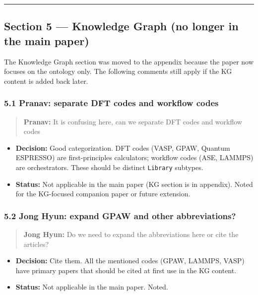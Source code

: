 \begin{center}\rule{0.5\linewidth}{0.5pt}\end{center}

\subsection{Section 5 --- Knowledge Graph (no longer in the main paper)}\label{section-5-knowledge-graph-no-longer-in-the-main-paper}

The Knowledge Graph section was moved to the appendix because the paper now focuses on the ontology only. The following comments still apply if the KG content is added back later.

\subsubsection{5.1 Pranav: separate DFT codes and workflow codes}\label{pranav-separate-dft-codes-and-workflow-codes}

\begin{quote}
\textbf{Pranav:} It is confusing here, can we separate DFT codes and workflow codes
\end{quote}

\begin{itemize}
\tightlist
\item
  \textbf{Decision:} Good categorization. DFT codes (VASP, GPAW, Quantum ESPRESSO) are first-principles calculators; workflow codes (ASE, LAMMPS) are orchestrators. These should be distinct \texttt{Library} subtypes.
\item
  \textbf{Status:} {\color{orange!80!black}\faPauseCircle} Not applicable in the main paper (KG section is in appendix). Noted for the KG-focused companion paper or future extension.
\end{itemize}

\subsubsection{5.2 Jong Hyun: expand GPAW and other abbreviations?}\label{jong-hyun-expand-gpaw-and-other-abbreviations}

\begin{quote}
\textbf{Jong Hyun:} Do we need to expand the abbreviations here or cite the articles?
\end{quote}

\begin{itemize}
\tightlist
\item
  \textbf{Decision:} Cite them. All the mentioned codes (GPAW, LAMMPS, VASP) have primary papers that should be cited at first use in the KG content.
\item
  \textbf{Status:} {\color{orange!80!black}\faPauseCircle} Not applicable in the main paper. Noted.
\end{itemize}

